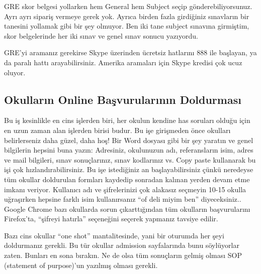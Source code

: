 \documentclass[12pt,a4paper]{article}
\begin{document}
GRE skor belgesi yollarken hem General hem Subject seçip gönderebiliyorsunuz. Ayrı ayrı sipariş vermeye gerek yok. Ayrıca birden fazla girdiğiniz sınavların bir tanesini yollamak gibi bir şey olmuyor. Ben iki tane subject sınavına girmiştim, skor belgelerinde her iki sınav ve genel sınav sonucu yazıyordu. 

GRE'yi aramanız gerekirse Skype üzerinden ücretsiz hatlarını 888 ile başlayan, ya da paralı hattı arayabilirsiniz. Amerika aramaları için Skype kredisi çok ucuz oluyor.  

\subsection{Okulların Online Başvurularının Doldurması}
Bu iş kesinlikle en cins işlerden biri, her okulun kendine has soruları olduğu için en uzun zaman alan işlerden birisi budur. Bu işe girişmeden önce okulları belirlerseniz daha güzel, daha hoş! Bir Word dosyası gibi bir şey yaratın ve genel bilgilerin hepsini buna yazın: Adresiniz, okulunuzun adı, referansların isim, adres ve mail bilgileri, sınav sonuçlarınız, sınav kodlarınız vs. Copy paste kullanarak bu işi çok hızlandırabilirsiniz. Bu işe istediğiniz an başlayabilirsiniz çünkü neredeyse tüm okullar doldurulan formları kaydedip sonradan kalınan yerden devam etme imkanı veriyor. Kullanıcı adı ve şifrelerinizi çok alakasız seçmeyin 10-15 okulla uğraşırken hepsine farklı isim kullanırsanız ``of deli miyim ben'' diyeceksiniz.. Google Chrome bazı okullarda sorun çıkarttığından tüm okulların başvurularını Firefox'ta, ``şifreyi hatırla'' seçeneğini seçerek yapmanız tavsiye edilir.  

Bazı cins okullar ``one shot'' mantalitesinde, yani bir oturumda her şeyi doldurmanız gerekli. Bu tür okullar admission sayfalarında bunu söylüyorlar zaten. Bunları en sona bırakın. Ne de olsa tüm sonuçların gelmiş olması SOP (statement of purpose)'un yazılmış olması gerekli. 
\end{document}
